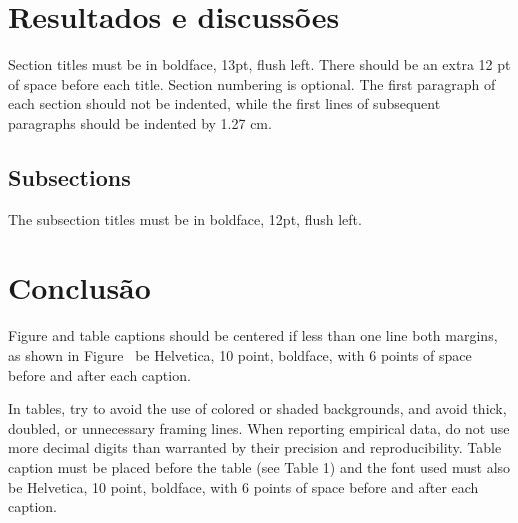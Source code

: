 \documentclass[12pt]{article}
\begin{document}
\section{Resultados e discussões}

Section titles must be in boldface, 13pt, flush left. There should be an extra
12 pt of space before each title. Section numbering is optional. The first
paragraph of each section should not be indented, while the first lines of
subsequent paragraphs should be indented by 1.27 cm.

\subsection{Subsections}

The subsection titles must be in boldface, 12pt, flush left.

\section{Conclusão}\label{sec:figs}


Figure and table captions should be centered if less than one line
both margins, as shown in Figure~%
be Helvetica, 10 point, boldface, with 6 points of space before and after each
caption.



In tables, try to avoid the use of colored or shaded backgrounds, and avoid
thick, doubled, or unnecessary framing lines. When reporting empirical data,
do not use more decimal digits than warranted by their precision and
reproducibility. Table caption must be placed before the table (see Table 1)
and the font used must also be Helvetica, 10 point, boldface, with 6 points of
space before and after each caption.




\end{document}
